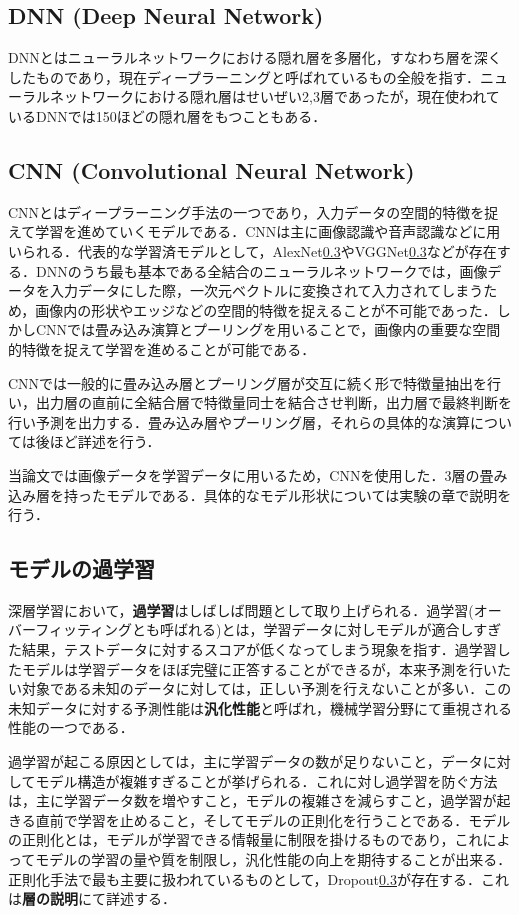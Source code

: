 \documentclass[a4j, 11pt]{jreport}
\begin{document}
\subsection{DNN (Deep Neural Network)}
DNNとはニューラルネットワークにおける隠れ層を多層化，すなわち層を深くしたものであり，現在ディープラーニングと呼ばれているもの全般を指す．ニューラルネットワークにおける隠れ層はせいぜい2,3層であったが，現在使われているDNNでは150ほどの隠れ層をもつこともある．

\subsection{CNN (Convolutional Neural Network)}
CNNとはディープラーニング手法の一つであり，入力データの空間的特徴を捉えて学習を進めていくモデルである．CNNは主に画像認識や音声認識などに用いられる．代表的な学習済モデルとして，AlexNet\ref{}やVGGNet\ref{}などが存在する．DNNのうち最も基本である全結合のニューラルネットワークでは，画像データを入力データにした際，一次元ベクトルに変換されて入力されてしまうため，画像内の形状やエッジなどの空間的特徴を捉えることが不可能であった．しかしCNNでは畳み込み演算とプーリングを用いることで，画像内の重要な空間的特徴を捉えて学習を進めることが可能である．

CNNでは一般的に畳み込み層とプーリング層が交互に続く形で特徴量抽出を行い，出力層の直前に全結合層で特徴量同士を結合させ判断，出力層で最終判断を行い予測を出力する．畳み込み層やプーリング層，それらの具体的な演算については後ほど詳述を行う．

当論文では画像データを学習データに用いるため，CNNを使用した．3層の畳み込み層を持ったモデルである．具体的なモデル形状については実験の章で説明を行う．

\subsection{モデルの過学習}
深層学習において，\textbf{過学習}はしばしば問題として取り上げられる．過学習(オーバーフィッティングとも呼ばれる)とは，学習データに対しモデルが適合しすぎた結果，テストデータに対するスコアが低くなってしまう現象を指す．過学習したモデルは学習データをほぼ完璧に正答することができるが，本来予測を行いたい対象である未知のデータに対しては，正しい予測を行えないことが多い．この未知データに対する予測性能は\textbf{汎化性能}と呼ばれ，機械学習分野にて重視される性能の一つである．

過学習が起こる原因としては，主に学習データの数が足りないこと，データに対してモデル構造が複雑すぎることが挙げられる．これに対し過学習を防ぐ方法は，主に学習データ数を増やすこと，モデルの複雑さを減らすこと，過学習が起きる直前で学習を止めること，そしてモデルの正則化を行うことである．モデルの正則化とは，モデルが学習できる情報量に制限を掛けるものであり，これによってモデルの学習の量や質を制限し，汎化性能の向上を期待することが出来る．正則化手法で最も主要に扱われているものとして，Dropout\ref{}が存在する．これは\textbf{層の説明}にて詳述する．
\end{document}
